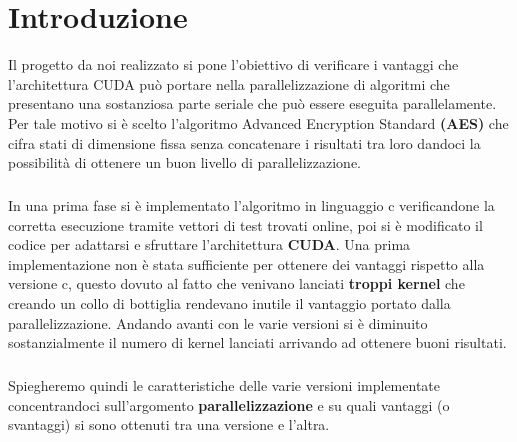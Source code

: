 \chapter{Introduzione}
Il progetto da noi realizzato si pone l'obiettivo di verificare i vantaggi che l'architettura CUDA può portare nella parallelizzazione di algoritmi che presentano una sostanziosa parte seriale che può essere eseguita parallelamente. Per tale motivo si è scelto l'algoritmo Advanced Encryption Standard \textbf{(AES)} che cifra stati di dimensione fissa senza concatenare i risultati tra loro dandoci la possibilità di ottenere un buon livello di parallelizzazione.

\paragraph{}In una prima fase si è implementato l'algoritmo in linguaggio c verificandone la corretta esecuzione tramite vettori di test trovati online, poi si è modificato il codice per adattarsi e sfruttare l'architettura \textbf{CUDA}. Una prima implementazione non è stata sufficiente per ottenere dei vantaggi rispetto alla versione c, questo dovuto al fatto che venivano lanciati \textbf{troppi kernel} che creando un collo di bottiglia rendevano inutile il vantaggio portato dalla parallelizzazione. Andando avanti con le varie versioni si è diminuito sostanzialmente il numero di kernel lanciati arrivando ad ottenere buoni risultati.

\paragraph{} Spiegheremo quindi le caratteristiche delle varie versioni implementate concentrandoci sull'argomento \textbf{parallelizzazione} e su quali vantaggi (o svantaggi) si sono ottenuti tra una versione e l'altra.